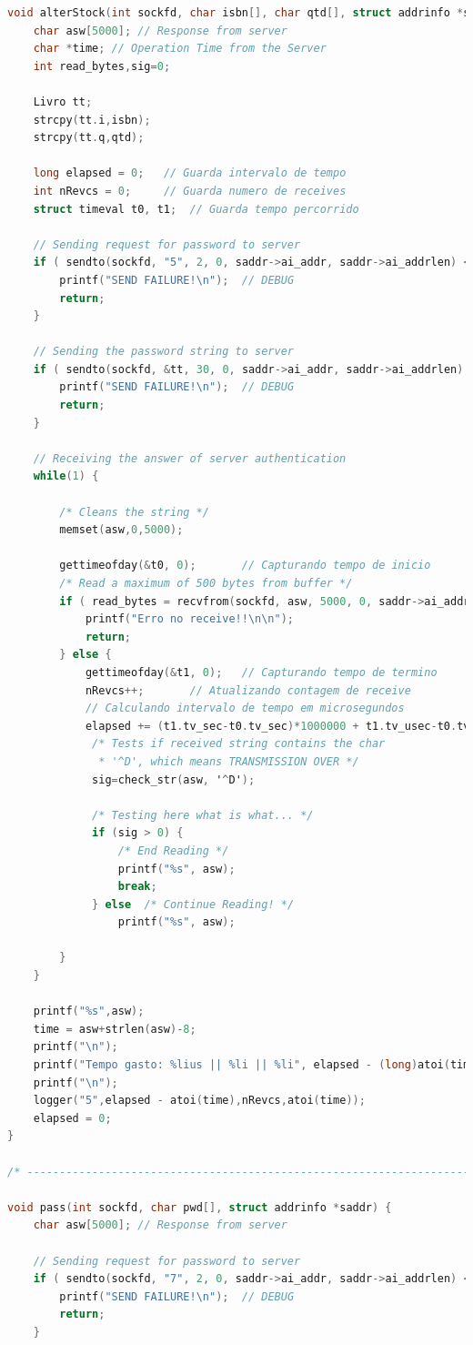 \documentclass[10pt,a4paper]{report}
\begin{document}
\begin{lstlisting}[language=C]
void alterStock(int sockfd, char isbn[], char qtd[], struct addrinfo *saddr) {
	char asw[5000];	// Response from server
	char *time;	// Operation Time from the Server
	int read_bytes,sig=0;

	Livro tt;
	strcpy(tt.i,isbn);
	strcpy(tt.q,qtd);

	long elapsed = 0; 	// Guarda intervalo de tempo
	int nRevcs = 0;		// Guarda numero de receives
	struct timeval t0, t1;	// Guarda tempo percorrido

	// Sending request for password to server
	if ( sendto(sockfd, "5", 2, 0, saddr->ai_addr, saddr->ai_addrlen) < 0) {
		printf("SEND FAILURE!\n");	// DEBUG 
		return;
	}

	// Sending the password string to server
	if ( sendto(sockfd, &tt, 30, 0, saddr->ai_addr, saddr->ai_addrlen) < 0) {
		printf("SEND FAILURE!\n");	// DEBUG 
		return;
	}

	// Receiving the answer of server authentication
	while(1) {

		/* Cleans the string */
		memset(asw,0,5000);

		gettimeofday(&t0, 0);		// Capturando tempo de inicio
		/* Read a maximum of 500 bytes from buffer */
		if ( read_bytes = recvfrom(sockfd, asw, 5000, 0, saddr->ai_addr, &saddr->ai_addrlen) < 0 ) {
			printf("Erro no receive!!\n\n");
			return;
		} else {
			gettimeofday(&t1, 0);	// Capturando tempo de termino
			nRevcs++;		// Atualizando contagem de receive
			// Calculando intervalo de tempo em microsegundos
			elapsed += (t1.tv_sec-t0.tv_sec)*1000000 + t1.tv_usec-t0.tv_usec;
			 /* Tests if received string contains the char
			  * '^D', which means TRANSMISSION OVER */
			 sig=check_str(asw, '^D');
			 
			 /* Testing here what is what... */
			 if (sig > 0) {
				 /* End Reading */
				 printf("%s", asw);
				 break;
			 } else  /* Continue Reading! */
				 printf("%s", asw);
			 
		}
	}

	printf("%s",asw);
	time = asw+strlen(asw)-8;
	printf("\n");
	printf("Tempo gasto: %lius || %li || %li", elapsed - (long)atoi(time), elapsed, (long)atoi(time));
	printf("\n");
	logger("5",elapsed - atoi(time),nRevcs,atoi(time));
	elapsed = 0;
}

/* -------------------------------------------------------------------------- */

void pass(int sockfd, char pwd[], struct addrinfo *saddr) {
	char asw[5000];	// Response from server

	// Sending request for password to server
	if ( sendto(sockfd, "7", 2, 0, saddr->ai_addr, saddr->ai_addrlen) < 0) {
		printf("SEND FAILURE!\n");	// DEBUG 
		return;
	}


\end{lstlisting}
\end{document}
